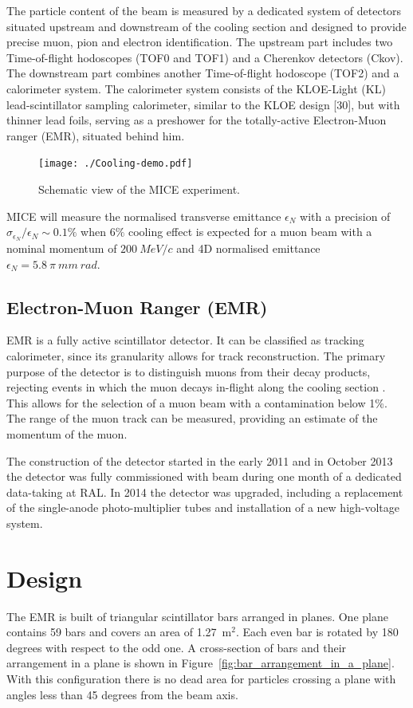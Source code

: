 \documentclass[a4paper,11pt]{article}
\begin{document}
The particle content of the beam is measured by a dedicated system of detectors situated upstream and downstream of the
cooling section and designed to provide precise muon, pion and electron identification. The upstream part includes two
Time-of-flight hodoscopes (TOF0 and TOF1) and a Cherenkov detectors (Ckov). The downstream part combines another 
Time-of-flight hodoscope (TOF2) and a calorimeter system. The calorimeter system consists of the KLOE-Light (KL)
lead-scintillator sampling calorimeter, similar to the KLOE design [30], but with thinner lead foils, serving
as a preshower for the totally-active Electron-Muon ranger (EMR), situated behind him.

\begin{figure}[h]
 \texttt{[image: ./Cooling-demo.pdf]}
 \caption{Schematic view of the MICE experiment.}
 \label{mice}
\end{figure}

MICE will measure the normalised transverse emittance $\epsilon_N$ with a precision of 
$\sigma_{\epsilon_N}/\epsilon_N \sim 0.1 \%$ when $6\%$ cooling effect is  expected for a muon beam with a nominal momentum
of $200 \ MeV/c$ and 4D normalised emittance $\epsilon_N = 5.8 \ \pi~mm~rad$.

\subsection{Electron-Muon Ranger (EMR)}
EMR is a fully active scintillator detector. It can be classified as tracking calorimeter, since its granularity allows for track
reconstruction. The primary purpose of the detector is to distinguish muons from their decay products, rejecting events in which
the muon decays in-flight along the cooling section \cite{ruslan}.  This allows for the selection of a muon beam with a contamination
below 1\%. The range of the muon track can be measured, providing an estimate of the momentum of the muon. 

The construction of the detector started in the early 2011 and in October 2013 the detector was fully commissioned with beam
during one month of a dedicated data-taking at RAL. In 2014 the detector was upgraded, including a replacement of the single-anode
photo-multiplier tubes and installation of a new high-voltage system.

\section{Design}
The EMR is built of triangular scintillator bars arranged in planes. 
One plane contains 59 bars and covers an area of 1.27~m$^2$. Each even bar is rotated by 180 degrees with respect to the odd one.
A cross-section of bars and their arrangement in a plane is shown in Figure~\ref{fig:bar_arrangement_in_a_plane}. With this
configuration there is no dead area for particles crossing a plane with angles less than 45 degrees from the beam axis.
\end{document}
